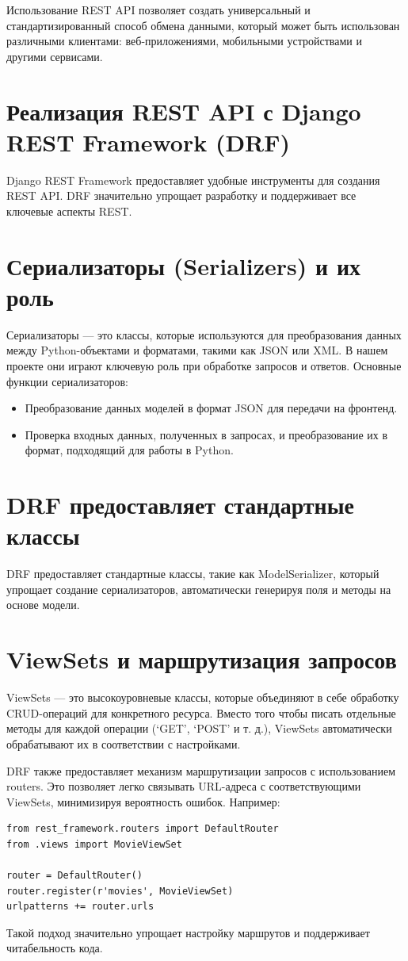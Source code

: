 Использование REST API позволяет создать универсальный и стандартизированный способ обмена данными, который может быть использован различными клиентами: веб-приложениями, мобильными устройствами и другими сервисами.

\section{Реализация REST API с Django REST Framework (DRF)}
Django REST Framework предоставляет удобные инструменты для создания REST API. DRF значительно упрощает разработку и поддерживает все ключевые аспекты REST.

\section{Сериализаторы (Serializers) и их роль}
Сериализаторы — это классы, которые используются для преобразования данных между Python-объектами и форматами, такими как JSON или XML. В нашем проекте они играют ключевую роль при обработке запросов и ответов. Основные функции сериализаторов:
\begin{itemize}
    \item Преобразование данных моделей в формат JSON для передачи на фронтенд.
    \item Проверка входных данных, полученных в запросах, и преобразование их в формат, подходящий для работы в Python.
\end{itemize}

\section{DRF предоставляет стандартные классы}
DRF предоставляет стандартные классы, такие как ModelSerializer, который упрощает создание сериализаторов, автоматически генерируя поля и методы на основе модели.

\section{ViewSets и маршрутизация запросов}
ViewSets — это высокоуровневые классы, которые объединяют в себе обработку CRUD-операций для конкретного ресурса. Вместо того чтобы писать отдельные методы для каждой операции (‘GET’, ‘POST’ и т. д.), ViewSets автоматически обрабатывают их в соответствии с настройками.

DRF также предоставляет механизм маршрутизации запросов с использованием routers. Это позволяет легко связывать URL-адреса с соответствующими ViewSets, минимизируя вероятность ошибок. Например:
\begin{verbatim}
from rest_framework.routers import DefaultRouter
from .views import MovieViewSet

router = DefaultRouter()
router.register(r'movies', MovieViewSet)
urlpatterns += router.urls
\end{verbatim}
Такой подход значительно упрощает настройку маршрутов и поддерживает читабельность кода.

